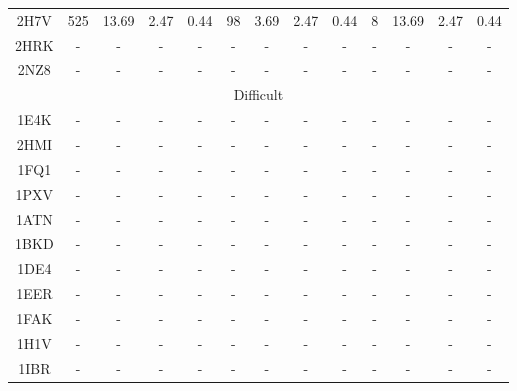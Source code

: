 \begin{longtable}{c c c c c|c c c c|c c c c}
 {\tiny 2H7V} &{\tiny 525}&{\tiny 13.69}&{\tiny 2.47}&{\tiny 0.44} &{\tiny 98}&{\tiny 3.69}&{\tiny 2.47}&{\tiny 0.44} &{\tiny 8}&{\tiny 13.69}&{\tiny 2.47}&{\tiny 0.44}\\ 
 {\tiny 2HRK} &{\tiny -}&{\tiny -}&{\tiny -}&{\tiny -} &{\tiny -}&{\tiny -}&{\tiny -}&{\tiny -} &{\tiny -}&{\tiny -}&{\tiny -}&{\tiny -}\\ 
 {\tiny 2NZ8} &{\tiny -}&{\tiny -}&{\tiny -}&{\tiny -} &{\tiny -}&{\tiny -}&{\tiny -}&{\tiny -} &{\tiny -}&{\tiny -}&{\tiny -}&{\tiny -}\\ 
 \multicolumn{13}{c}{Difficult}\\
{\tiny 1E4K} &{\tiny -}&{\tiny -}&{\tiny -}&{\tiny -} &{\tiny -}&{\tiny -}&{\tiny -}&{\tiny -} &{\tiny -}&{\tiny -}&{\tiny -}&{\tiny -}\\ 
 {\tiny 2HMI} &{\tiny -}&{\tiny -}&{\tiny -}&{\tiny -} &{\tiny -}&{\tiny -}&{\tiny -}&{\tiny -} &{\tiny -}&{\tiny -}&{\tiny -}&{\tiny -}\\ 
 {\tiny 1FQ1} &{\tiny -}&{\tiny -}&{\tiny -}&{\tiny -} &{\tiny -}&{\tiny -}&{\tiny -}&{\tiny -} &{\tiny -}&{\tiny -}&{\tiny -}&{\tiny -}\\ 
 {\tiny 1PXV} &{\tiny -}&{\tiny -}&{\tiny -}&{\tiny -} &{\tiny -}&{\tiny -}&{\tiny -}&{\tiny -} &{\tiny -}&{\tiny -}&{\tiny -}&{\tiny -}\\ 
 {\tiny 1ATN} &{\tiny -}&{\tiny -}&{\tiny -}&{\tiny -} &{\tiny -}&{\tiny -}&{\tiny -}&{\tiny -} &{\tiny -}&{\tiny -}&{\tiny -}&{\tiny -}\\ 
 {\tiny 1BKD} &{\tiny -}&{\tiny -}&{\tiny -}&{\tiny -} &{\tiny -}&{\tiny -}&{\tiny -}&{\tiny -} &{\tiny -}&{\tiny -}&{\tiny -}&{\tiny -}\\ 
 {\tiny 1DE4} &{\tiny -}&{\tiny -}&{\tiny -}&{\tiny -} &{\tiny -}&{\tiny -}&{\tiny -}&{\tiny -} &{\tiny -}&{\tiny -}&{\tiny -}&{\tiny -}\\ 
 {\tiny 1EER} &{\tiny -}&{\tiny -}&{\tiny -}&{\tiny -} &{\tiny -}&{\tiny -}&{\tiny -}&{\tiny -} &{\tiny -}&{\tiny -}&{\tiny -}&{\tiny -}\\ 
 {\tiny 1FAK} &{\tiny -}&{\tiny -}&{\tiny -}&{\tiny -} &{\tiny -}&{\tiny -}&{\tiny -}&{\tiny -} &{\tiny -}&{\tiny -}&{\tiny -}&{\tiny -}\\ 
 {\tiny 1H1V} &{\tiny -}&{\tiny -}&{\tiny -}&{\tiny -} &{\tiny -}&{\tiny -}&{\tiny -}&{\tiny -} &{\tiny -}&{\tiny -}&{\tiny -}&{\tiny -}\\ 
 {\tiny 1IBR} &{\tiny -}&{\tiny -}&{\tiny -}&{\tiny -} &{\tiny -}&{\tiny -}&{\tiny -}&{\tiny -} &{\tiny -}&{\tiny -}&{\tiny -}&{\tiny -}\\ 

\end{longtable}
